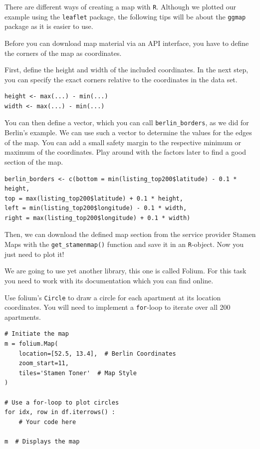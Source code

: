 \documentclass[
  11pt,
]{article}
\newenvironment{tips}[1]
  {
  \begin{itemize}
  \footnotesize
  \renewcommand{\labelitemi}{
    \raisebox{-.7\height}[0pt][0pt]{
      {\setkeys{Gin}{width=3em,keepaspectratio}
        \texttt{[image: images/\#1.png]}}
    }
  }
  \setlength{\fboxsep}{1em}
  \begin{rbox}
  \item
  }
  {
  \end{rbox}
  \end{itemize}
  }
\newenvironment{tipsp}[1]
  {
  \begin{itemize}
  \footnotesize
  \renewcommand{\labelitemi}{
    \raisebox{-.7\height}[0pt][0pt]{
      {\setkeys{Gin}{width=3em,keepaspectratio}
        \texttt{[image: images/\#1.png]}}
    }
  }
  \setlength{\fboxsep}{1em}
  \begin{pbox}
  \item
  }
  {
  \end{pbox}
  \end{itemize}
  }
\begin{document}
\begin{tips}r
There are different ways of creating a map with \texttt{R}.
Although we plotted our example using the \texttt{leaflet} package, the following tips will be about the \texttt{ggmap} package as it is easier to use.

Before you can download map material via an API interface, you have to define the corners of the map as coordinates.

First, define the height and width of the included coordinates.
In the next step, you can specify the exact corners relative to the coordinates in the data set.

\begin{verbatim}
height <- max(...) - min(...)
width <- max(...) - min(...)
\end{verbatim}

You can then define a vector, which you can call \texttt{berlin\_borders}, as we did for Berlin's example.
We can use such a vector to determine the values for the edges of the map.
You can add a small safety margin to the respective minimum or maximum of the coordinates.
Play around with the factors later to find a good section of the map.

\begin{verbatim}
berlin_borders <- c(bottom = min(listing_top200$latitude) - 0.1 * height,
top = max(listing_top200$latitude) + 0.1 * height,
left = min(listing_top200$longitude) - 0.1 * width,
right = max(listing_top200$longitude) + 0.1 * width)
\end{verbatim}

Then, we can download the defined map section from the service provider Stamen Maps with the \texttt{get\_stamenmap()} function and save it in an \texttt{R}-object.
Now you just need to plot it!

\end{tips}

\begin{tipsp}p

We are going to use yet another library, this one is called Folium.
For this task you need to work with its documentation which you can find online.

Use folium's \texttt{Circle} to draw a circle for each apartment at its location coordinates.
You will need to implement a \texttt{for}-loop to iterate over all 200 apartments.

\begin{verbatim}
# Initiate the map
m = folium.Map(
    location=[52.5, 13.4],  # Berlin Coordinates
    zoom_start=11,
    tiles='Stamen Toner'  # Map Style
)

# Use a for-loop to plot circles
for idx, row in df.iterrows() :
    # Your code here

m  # Displays the map
\end{verbatim}

\end{tipsp}
\end{document}
